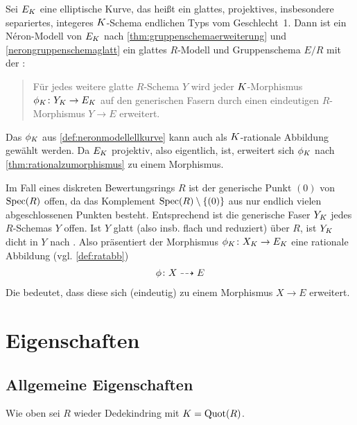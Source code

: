 
\begin{Bemerkung}
  \label{def:neronmodellellkurve}
  Sei $E_{K}$ eine elliptische Kurve, das heißt ein
  glattes, projektives, insbesondere separiertes, integeres
  $K$-Schema endlichen Typs vom Geschlecht~1.
  Dann ist ein Néron-Modell von $E_{K}$ nach
  \ref{thm:gruppenschemaerweiterung} und \ref{nerongruppenschemaglatt}
  ein glattes $R$-Modell und Gruppenschema $E/R$ mit der
  \NAbbEig:
  \begin{quote}
    Für jedes weitere glatte $R$-Schema $Y$ wird jeder
    $K$-Morphismus $\phi_{K}\colon Y_{K}\to E_{K}$ auf den generischen
    Fasern durch einen eindeutigen $R$-Morphismus $Y\to E$ erweitert.
  \end{quote}
\end{Bemerkung}
\begin{Bemerkung}\label{thm:dichtefaser}
  Das $\phi_{K}$ aus \ref{def:neronmodellellkurve} kann auch als
  $K$-rationale Abbildung gewählt werden. Da $E_{K}$ projektiv, also
  eigentlich, ist, erweitert sich $\phi_{K}$ nach
  \ref{thm:rationalzumorphismus} zu einem Morphismus.

  Im Fall eines diskreten Bewertungsrings $R$ ist der generische Punkt
  $(0)$ von $\operatorname{Spec}(R)$ offen, da das Komplement
  $\operatorname{Spec}(R)\setminus\{(0)\}$ aus nur endlich vielen abgeschlossenen
  Punkten besteht. Entsprechend ist die generische Faser $Y_{K}$ jedes
  $R$-Schemas $Y$ offen.
  Ist $Y$ glatt (also insb. flach und reduziert) über $R$, ist $Y_{K}$
  dicht in $Y$ nach \cite[Proposition III.9.7]{hartshorne}.
  Also präsentiert der Morphismus $\phi_{K}\colon X_{K}\to E_{K}$ eine
  rationale Abbildung (vgl. \ref{def:ratabb})
  \begin{gather*}
    \phi\colon X\dashrightarrow E
  \end{gather*}
  Die \NAbbEig bedeutet, dass diese sich (eindeutig) zu einem
  Morphismus $X\to E$ erweitert.
\end{Bemerkung}


\section{Eigenschaften}
\subsection{Allgemeine Eigenschaften}
Wie oben sei $R$ wieder Dedekindring mit $K=\operatorname{Quot}(R)$.

